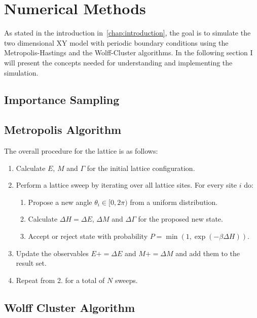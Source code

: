 \section{Numerical Methods}
	As stated in the introduction in~\cref{chap:introduction}, the goal is to simulate the two dimensional XY model with periodic boundary conditions using the Metropolis-Hastings and the Wolff-Cluster algorithms. In the following section I will present the concepts needed for understanding and implementing the simulation.
	
	\subsection{Importance Sampling}
		

	\subsection{Metropolis Algorithm}
	
	
		The overall procedure for the lattice is as follows:
		\begin{enumerate}
			\item Calculate $E$, $M$ and $\Gamma$ for the initial lattice configuration.
			\item Perform a lattice sweep by iterating over all lattice sites. For every site $i$ do:
			\begin{enumerate}
				\item Propose a new angle $\theta_i \in [0,2\pi)$ from a uniform distribution.
				\item Calculate $\Delta H = \Delta E$, $\Delta M$ and $\Delta \Gamma$ for the proposed new state.
				\item Accept or reject state with probability $P = \min{(1, \exp{(-\beta\Delta H)})}$.
			\end{enumerate}
			\item Update the observables $E \mathrel{{+}{=}} \Delta E$ and $M \mathrel{{+}{=}} \Delta M$ and add them to the result set.
			\item Repeat from 2. for a total of $N$ sweeps.
		\end{enumerate}
		
	\subsection{Wolff Cluster Algorithm}
		
	
